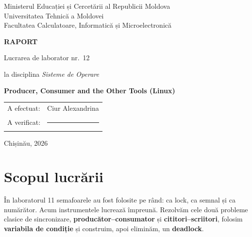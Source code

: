 \documentclass[11pt,a4paper]{article}
\begin{document}
\begin{titlepage}
\centering
{\large Ministerul Educației și Cercetării al Republicii Moldova\\
Universitatea Tehnică a Moldovei\\
Facultatea Calculatoare, Informatică și Microelectronică\par}
\vspace{5cm}
{\LARGE\bfseries RAPORT\par}
\vspace{0.6cm}
{\Large Lucrarea de laborator nr.~12\par}
\vspace{0.4cm}
{\large la disciplina \textit{Sisteme de Operare}\par}
\vspace{0.6cm}
{\Large\bfseries Producer, Consumer and the Other Tools (Linux)\par}
\vfill
\begin{flushright}
\begin{tabular}{ll}
A efectuat: & Ciur Alexandrina \\
A verificat: & \rule{4.5cm}{0.4pt} \\
\end{tabular}
\end{flushright}
\vspace{2cm}
{\large Chișinău, 2026\par}
\end{titlepage}

\section*{Scopul lucrării}
În laboratorul 11 semafoarele au fost folosite pe rând: ca lock, ca semnal și ca numărător. Acum instrumentele lucrează
împreună. Rezolvăm cele două probleme clasice de sincronizare, \textbf{producător--consumator} și
\textbf{cititori--scriitori}, folosim \textbf{variabila de condiție} și construim, apoi eliminăm, un
\textbf{deadlock}.
\end{document}
